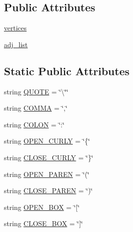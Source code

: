 \subsection*{Public Attributes}
\begin{DoxyCompactItemize}
\item 
\hyperlink{class_graph_adj_list_1_1_graph_adj_list_a47f4552a36c0fdc7d7599a7b5b47177d}{vertices}
\item 
\hyperlink{class_graph_adj_list_1_1_graph_adj_list_adf27f860d178d9d0f0aa3c3a6c45afe9}{adj\+\_\+list}
\end{DoxyCompactItemize}
\subsection*{Static Public Attributes}
\begin{DoxyCompactItemize}
\item 
string \hyperlink{class_graph_adj_list_1_1_graph_adj_list_ae489d4c9c6cb6a63bb665b2e0e581424}{Q\+U\+O\+T\+E} = \char`\"{}\textbackslash{}\char`\"{}\char`\"{}
\item 
string \hyperlink{class_graph_adj_list_1_1_graph_adj_list_a22cc94b0ffed81e5a10a07683991032e}{C\+O\+M\+M\+A} = \char`\"{},\char`\"{}
\item 
string \hyperlink{class_graph_adj_list_1_1_graph_adj_list_a0cca3c83769fec01a7f04cc4691f9cfd}{C\+O\+L\+O\+N} = \char`\"{}\+:\char`\"{}
\item 
string \hyperlink{class_graph_adj_list_1_1_graph_adj_list_a55b37931a5f3113f12f2f48a7cfc2697}{O\+P\+E\+N\+\_\+\+C\+U\+R\+L\+Y} = \char`\"{}\{\char`\"{}
\item 
string \hyperlink{class_graph_adj_list_1_1_graph_adj_list_a109c652c9dc7ff9be5a5af35f402e1f3}{C\+L\+O\+S\+E\+\_\+\+C\+U\+R\+L\+Y} = \char`\"{}\}\char`\"{}
\item 
string \hyperlink{class_graph_adj_list_1_1_graph_adj_list_a3aca6e4357896f9c5b9316eacdd2e8ed}{O\+P\+E\+N\+\_\+\+P\+A\+R\+E\+N} = \char`\"{}(\char`\"{}
\item 
string \hyperlink{class_graph_adj_list_1_1_graph_adj_list_a6186142e40ba5a912dd509dccf03966d}{C\+L\+O\+S\+E\+\_\+\+P\+A\+R\+E\+N} = \char`\"{})\char`\"{}
\item 
string \hyperlink{class_graph_adj_list_1_1_graph_adj_list_abc1052576e4cb84515f67e9475e99bff}{O\+P\+E\+N\+\_\+\+B\+O\+X} = \char`\"{}\mbox{[}\char`\"{}
\item 
string \hyperlink{class_graph_adj_list_1_1_graph_adj_list_a9e39b4c864ed25ddc526bea2e02e1e76}{C\+L\+O\+S\+E\+\_\+\+B\+O\+X} = \char`\"{}\mbox{]}\char`\"{}
\end{DoxyCompactItemize}


